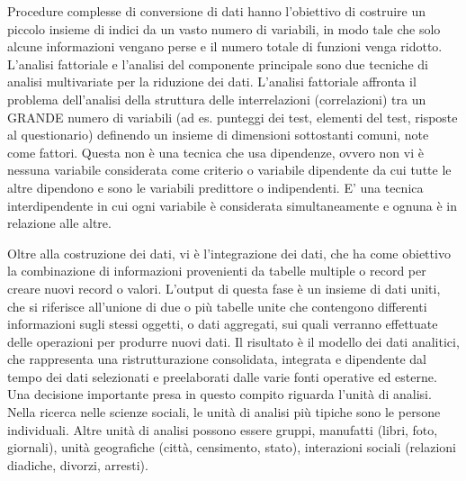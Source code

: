 \documentclass[a4paper]{extarticle}
\begin{document}
Procedure complesse di conversione di dati hanno l'obiettivo di costruire un piccolo insieme di indici da un vasto numero di variabili, in modo tale che solo alcune informazioni vengano perse e il numero totale di funzioni venga ridotto. L'analisi fattoriale e l'analisi del componente principale sono due tecniche di analisi multivariate per la riduzione dei dati. L'analisi fattoriale affronta il problema dell'analisi della struttura delle interrelazioni (correlazioni) tra un GRANDE numero di variabili (ad es. punteggi dei test, elementi del test, risposte al questionario) definendo un insieme di dimensioni sottostanti comuni, note come fattori. Questa non è una tecnica che usa dipendenze, ovvero non vi è nessuna variabile considerata come criterio o variabile dipendente da cui tutte le altre dipendono e sono le variabili predittore o indipendenti. E' una tecnica interdipendente in cui ogni variabile è considerata simultaneamente e ognuna è in relazione alle altre.

Oltre alla costruzione dei dati, vi è l'integrazione dei dati, che ha come obiettivo la combinazione di informazioni provenienti da tabelle multiple o record per creare nuovi record o valori. L'output di questa fase è un insieme di dati uniti, che si riferisce all'unione di due o più tabelle unite che contengono differenti informazioni sugli stessi oggetti, o dati aggregati, sui quali verranno effettuate delle operazioni per produrre nuovi dati. Il risultato è il modello dei dati analitici, che rappresenta una ristrutturazione consolidata, integrata e dipendente dal tempo dei dati selezionati e preelaborati dalle varie fonti operative ed esterne. Una decisione importante presa in questo compito riguarda l'unità di analisi. Nella ricerca nelle scienze sociali, le unità di analisi più tipiche sono le persone individuali. Altre unità di analisi possono essere gruppi, manufatti (libri, foto, giornali), unità geografiche (città, censimento, stato), interazioni sociali (relazioni diadiche, divorzi, arresti).
\end{document}
